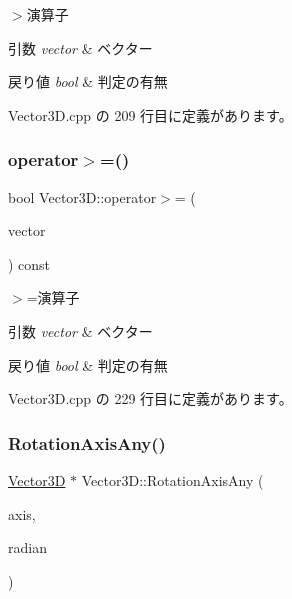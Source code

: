 $>$演算子 


\begin{DoxyParams}{引数}
{\em vector} & ベクター \\
\hline
\end{DoxyParams}

\begin{DoxyRetVals}{戻り値}
{\em bool} & 判定の有無 \\
\hline
\end{DoxyRetVals}


 Vector3\+D.\+cpp の 209 行目に定義があります。

\mbox{\label{class_vector3_d_a74d53debf36f302abf4d28a9300dae32}} 
\subsubsection{\texorpdfstring{operator$>$=()}{operator>=()}}
{\footnotesize\ttfamily bool Vector3\+D\+::operator$>$= (\begin{DoxyParamCaption}\item[{const \mbox{\hyperlink{class_vector3_d}{Vector3D}} \&}]{vector }\end{DoxyParamCaption}) const}



$>$=演算子 


\begin{DoxyParams}{引数}
{\em vector} & ベクター \\
\hline
\end{DoxyParams}

\begin{DoxyRetVals}{戻り値}
{\em bool} & 判定の有無 \\
\hline
\end{DoxyRetVals}


 Vector3\+D.\+cpp の 229 行目に定義があります。

\mbox{\label{class_vector3_d_ad20038581979a29c282793023057aef7}} 
\subsubsection{\texorpdfstring{Rotation\+Axis\+Any()}{RotationAxisAny()}}
{\footnotesize\ttfamily \mbox{\hyperlink{class_vector3_d}{Vector3D}} $\ast$ Vector3\+D\+::\+Rotation\+Axis\+Any (\begin{DoxyParamCaption}\item[{\mbox{\hyperlink{class_vector3_d}{Vector3D}}}]{axis,  }\item[{float}]{radian }\end{DoxyParamCaption})}



